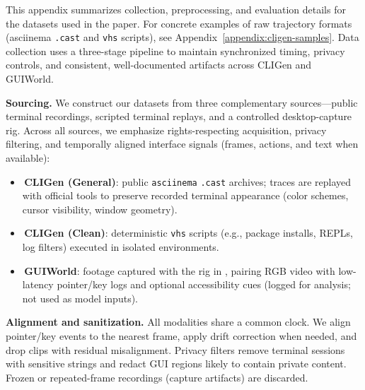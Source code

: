 \noindent This appendix summarizes collection, preprocessing, and evaluation details for the datasets used in the paper.
For concrete examples of raw trajectory formats (asciinema \texttt{.cast} and \texttt{vhs} scripts), see Appendix~\ref{appendix:cligen-samples}. 
Data collection uses a three-stage pipeline to maintain synchronized timing, privacy controls, and consistent, well-documented artifacts across CLIGen and GUIWorld.

\noindent\textbf{Sourcing.}
We construct our datasets from three complementary sources---public terminal recordings, scripted terminal replays, and a controlled desktop-capture rig.
Across all sources, we emphasize rights-respecting acquisition, privacy filtering, and temporally aligned interface signals (frames, actions, and text when available):
\begin{tcolorbox}[
  colback=apricotglaze!40!white,
  colframe=metablue!40,
  interior style={shade,shading angle=315,left color=white,right color=apricotglaze!55!white},
  boxrule=0pt,
  borderline west={1pt}{0pt}{gray!60},
  left=6pt,right=4pt,top=3pt,bottom=3pt]
\small
\begin{itemize}
  \setlength{\itemsep}{2pt}
  \setlength{\topsep}{2pt}
  \item \cligenGeneralLogo{}\,\textbf{CLIGen (General)}: public \texttt{asciinema} \texttt{.cast} archives; traces are replayed with official tools to preserve recorded terminal appearance (color schemes, cursor visibility, window geometry).
  \item \cligenCleanLogo{}\,\textbf{CLIGen (Clean)}: deterministic \texttt{vhs} scripts (e.g., package installs, REPLs, log filters) executed in isolated environments.
  \item \guiworldLogo{}\,\textbf{GUIWorld}: footage captured with the rig in , pairing RGB video with low-latency pointer/key logs and optional accessibility cues (logged for analysis; not used as model inputs).
\end{itemize}
\end{tcolorbox}

\noindent\textbf{Alignment and sanitization.} 
All modalities share a common clock.
We align pointer/key events to the nearest frame, apply drift correction when needed, and drop clips with residual misalignment.
Privacy filters remove terminal sessions with sensitive strings and redact GUI regions likely to contain private content.
Frozen or repeated-frame recordings (capture artifacts) are discarded.

